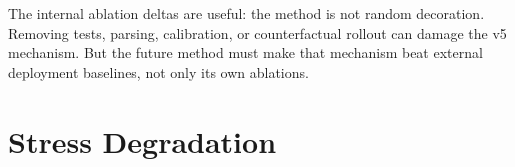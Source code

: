 \documentclass{article}
\begin{document}
\begin{table}[t]
\centering
\scriptsize
{}
\caption{Full-v5 minus ablated variant. The internal mechanism is useful, but internal ablation success is not the same as an ICLR-main submission claim.}
\label{tab:ablationdelta}
\end{table}


The internal ablation deltas are useful: the method is not random decoration. Removing tests, parsing, calibration, or counterfactual rollout can damage the v5 mechanism. But the future method must make that mechanism beat external deployment baselines, not only its own ablations.

\section{Stress Degradation}
\end{document}
